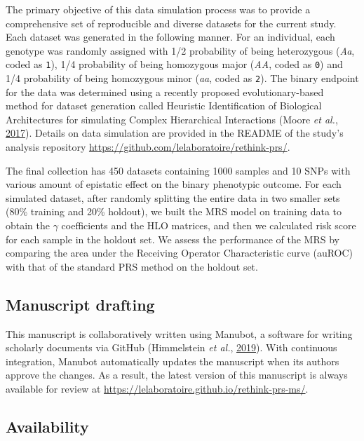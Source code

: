 \documentclass{ws-procs11x85}
\begin{document}
The primary objective of this data simulation process was to provide a
comprehensive set of reproducible and diverse datasets for the current
study. Each dataset was generated in the following manner. For an
individual, each genotype was randomly assigned with 1/2 probability of
being heterozygous (\emph{Aa}, coded as \texttt{1}), 1/4 probability of
being homozygous major (\emph{AA}, coded as \texttt{0}) and 1/4
probability of being homozygous minor (\emph{aa}, coded as \texttt{2}).
The binary endpoint for the data was determined using a recently
proposed evolutionary-based method for dataset generation called
Heuristic Identification of Biological Architectures for simulating
Complex Hierarchical Interactions (Moore \emph{et al.},
\protect\hyperlink{ref-pDXdtMFa}{2017}). Details on data simulation are
provided in the README of the study's analysis repository
\url{https://github.com/lelaboratoire/rethink-prs/}.

The final collection has 450 datasets containing 1000 samples and 10
SNPs with various amount of epistatic effect on the binary phenotypic
outcome. For each simulated dataset, after randomly splitting the entire
data in two smaller sets (80\% training and 20\% holdout), we built the
MRS model on training data to obtain the \(\gamma\) coefficients and the
HLO matrices, and then we calculated risk score for each sample in the
holdout set. We assess the performance of the MRS by comparing the area
under the Receiving Operator Characteristic curve (auROC) with that of
the standard PRS method on the holdout set.

\subsection{Manuscript drafting}\label{manuscript-drafting}


This manuscript is collaboratively written using Manubot, a software for
writing scholarly documents via GitHub (Himmelstein \emph{et al.},
\protect\hyperlink{ref-YuJbg3zO}{2019}). With continuous integration,
Manubot automatically updates the manuscript when its authors approve
the changes. As a result, the latest version of this manuscript is
always available for review at
\url{https://lelaboratoire.github.io/rethink-prs-ms/}.


\subsection{Availability}\label{availability}
\end{document}
